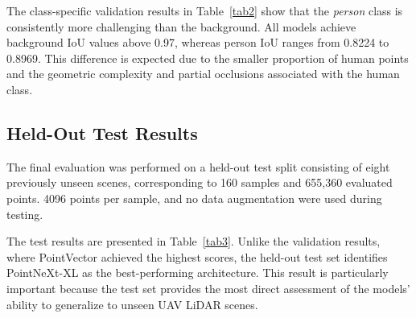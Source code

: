 The class-specific validation results in Table~\ref{tab2} show that the \textit{person} class is consistently more challenging than the background. All models achieve background IoU values above 0.97, whereas person IoU ranges from 0.8224 to 0.8969. This difference is expected due to the smaller proportion of human points and the geometric complexity and partial occlusions associated with the human class.

\begin{table}[H]
\centering
\caption{Class-specific validation performance for the evaluated models.}
\label{tab2}
\end{table}

\subsection{Held-Out Test Results}

The final evaluation was performed on a held-out test split consisting of eight previously unseen scenes, corresponding to 160 samples and 655,360 evaluated points. 4096 points per sample, and no data augmentation were used during testing.

The test results are presented in Table~\ref{tab3}. Unlike the validation results, where PointVector achieved the highest scores, the held-out test set identifies PointNeXt-XL as the best-performing architecture. This result is particularly important because the test set provides the most direct assessment of the models' ability to generalize to unseen UAV LiDAR scenes.

